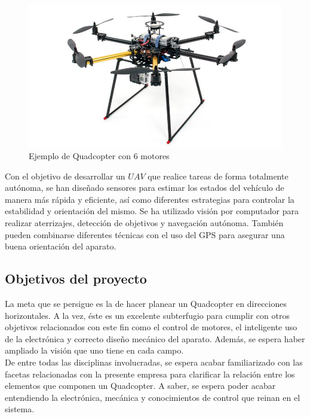 \documentclass[twoside]{article}
\begin{document}
\begin{figure}[h!]
\begin{center}
\includegraphics[scale=0.3]{images/6_armed_quadcopter.jpg}
\caption{Ejemplo de Quadcopter con 6 motores}
\end{center}
\end{figure}

Con el objetivo de desarrollar un $UAV$ que realice tareas de forma totalmente autónoma, se han diseñado sensores para estimar los estados del vehículo de manera más rápida y eficiente, así como diferentes estrategias para controlar la estabilidad y orientación del mismo. Se ha utilizado visión  por computador para realizar aterrizajes, detección de objetivos y navegación autónoma. También pueden combinarse diferentes técnicas con el uso del GPS para asegurar una buena orientación del aparato. \\

\subsection{Objetivos del proyecto}

La meta que se persigue es la de hacer planear un Quadcopter en direcciones horizontales. A la vez, éste es un excelente subterfugio para cumplir con otros objetivos relacionados con este fin como el control de motores, el inteligente uso de la electrónica y correcto diseño mecánico del aparato. Además, se espera haber ampliado la visión que uno tiene en cada campo. \\

De entre todas las disciplinas involucradas, se espera acabar familiarizado con las facetas relacionadas con la presente empresa para clarificar la relación entre los elementos que componen un Quadcopter.  A saber, se espera poder acabar entendiendo la electrónica, mecánica y conocimientos de control que reinan en el sistema. \\
\end{document}
